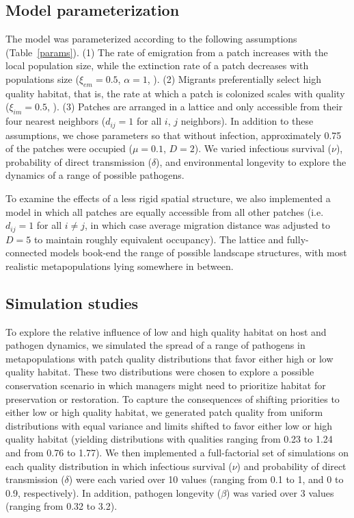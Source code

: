 \documentclass{article}
\begin{document}
\subsection{Model parameterization}

The model was parameterized according to the following assumptions (Table~\ref{params}). 
(1) The rate of emigration from a patch increases with the local population size, while the extinction rate of a patch decreases with populations size ($\xi_{em}=0.5$, $\alpha=1$, \cite{Hanski2003}).  
(2) Migrants preferentially select high quality habitat, that is, the rate at which a patch is colonized scales with quality ($\xi_{im}=0.5$, \cite{Hanski2003}).  
(3)  Patches are arranged in a lattice and only accessible from their four nearest neighbors ($d_{ij}=1$ for all $i$, $j$ neighbors).  
In addition to these assumptions, we chose parameters so that without infection, approximately 0.75 of the patches were occupied ($\mu = 0.1$, $D=2$).  We varied infectious survival ($\nu$), probability of direct transmission ($\delta$), and environmental longevity to explore the dynamics of a range of possible pathogens.

To examine the effects of a less rigid spatial structure, we also implemented a model in which all patches are equally accessible from all other patches (i.e. $d_{ij} = 1$ for all $i \neq j$, in which case average migration distance was adjusted to $D = 5$ to maintain roughly equivalent occupancy).  
The lattice and fully-connected models book-end the range of possible landscape structures, with most realistic metapopulations lying somewhere in between.

\subsection{Simulation studies}

To explore the relative influence of low and high quality habitat on host and pathogen dynamics, we simulated the spread of a range of pathogens in metapopulations with patch quality distributions that favor either high or low quality habitat.
These two distributions were chosen to explore a possible conservation scenario in which managers might need to prioritize habitat for preservation or restoration.
To capture the consequences of shifting priorities to either low or high quality habitat, we generated patch quality from uniform distributions with equal variance and limits shifted to favor either low or high quality habitat (yielding distributions with qualities ranging from 0.23 to 1.24 and from 0.76 to 1.77).  
We then implemented a full-factorial set of simulations on each quality distribution in which infectious survival ($\nu$) and probability of direct transmission ($\delta$) were each varied over 10 values (ranging from 0.1 to 1, and 0 to 0.9, respectively).  In addition, pathogen longevity ($\beta$) was varied over 3 values (ranging from 0.32 to 3.2).
\end{document}
